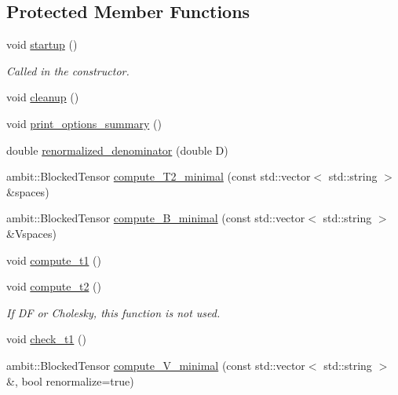 \subsection*{Protected Member Functions}
\begin{DoxyCompactItemize}
\item 
void \mbox{\hyperlink{classforte_1_1_t_h_r_e_e___d_s_r_g___m_r_p_t2_aa0b9829e2f4e0d6f1ac69db54c650d73}{startup}} ()
\begin{DoxyCompactList}\small\item\em Called in the constructor. \end{DoxyCompactList}\item 
void \mbox{\hyperlink{classforte_1_1_t_h_r_e_e___d_s_r_g___m_r_p_t2_a5e56e78b95c2d23c5f4c667d013ac5db}{cleanup}} ()
\item 
void \mbox{\hyperlink{classforte_1_1_t_h_r_e_e___d_s_r_g___m_r_p_t2_aeb1cc688698de36c56ecf747ead728de}{print\+\_\+options\+\_\+summary}} ()
\item 
double \mbox{\hyperlink{classforte_1_1_t_h_r_e_e___d_s_r_g___m_r_p_t2_a37cddc1f3c41da7fa5d42b84aa4a91f3}{renormalized\+\_\+denominator}} (double D)
\item 
ambit\+::\+Blocked\+Tensor \mbox{\hyperlink{classforte_1_1_t_h_r_e_e___d_s_r_g___m_r_p_t2_a232144ca3c57e71657902dd03c09661e}{compute\+\_\+\+T2\+\_\+minimal}} (const std\+::vector$<$ std\+::string $>$ \&spaces)
\item 
ambit\+::\+Blocked\+Tensor \mbox{\hyperlink{classforte_1_1_t_h_r_e_e___d_s_r_g___m_r_p_t2_a6047c439abc497d0ea337e0707a009c7}{compute\+\_\+\+B\+\_\+minimal}} (const std\+::vector$<$ std\+::string $>$ \&Vspaces)
\item 
void \mbox{\hyperlink{classforte_1_1_t_h_r_e_e___d_s_r_g___m_r_p_t2_ad86db75d7db516ac82c7286d88bd38e0}{compute\+\_\+t1}} ()
\item 
void \mbox{\hyperlink{classforte_1_1_t_h_r_e_e___d_s_r_g___m_r_p_t2_a6bcd43af18879ce5dc617eee23c23203}{compute\+\_\+t2}} ()
\begin{DoxyCompactList}\small\item\em If DF or Cholesky, this function is not used. \end{DoxyCompactList}\item 
void \mbox{\hyperlink{classforte_1_1_t_h_r_e_e___d_s_r_g___m_r_p_t2_ac7cd0969913f7590a78a1977239e5139}{check\+\_\+t1}} ()
\item 
ambit\+::\+Blocked\+Tensor \mbox{\hyperlink{classforte_1_1_t_h_r_e_e___d_s_r_g___m_r_p_t2_af5e8faa215d7d1274d47c1697bccf5ea}{compute\+\_\+\+V\+\_\+minimal}} (const std\+::vector$<$ std\+::string $>$ \&, bool renormalize=true)

\end{DoxyCompactItemize}
